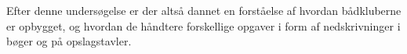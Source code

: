 Efter denne undersøgelse er der altså dannet en forståelse af hvordan bådkluberne er opbygget, og hvordan de håndtere forskellige opgaver i form af nedskrivninger i bøger og på opslagstavler.

%
\cbend
